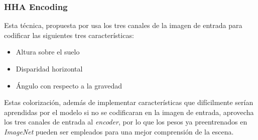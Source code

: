 \documentclass[12pt,a4paper]{report}
\begin{document}

\subsubsection{HHA Encoding}
\label{subsubsec:hha_encoding}
Esta técnica, propuesta por \cite{gupta2014learningrichfeaturesrgbd} usa los tres canales de la imagen de entrada para codificar las siguientes tres características:
\begin{itemize}
    \item Altura sobre el suelo
    \item Disparidad horizontal
    \item Ángulo con respecto a la gravedad
\end{itemize}
Estas colorización, además de implementar características que difícilmente serían aprendidas por el modelo si no se codificaran en la imagen de entrada, aprovecha los tres canales de entrada al \textit{encoder}, por lo que los pesos ya preentrenados en \textit{ImageNet} pueden ser empleados para una mejor comprensión de la escena.
\end{document}
